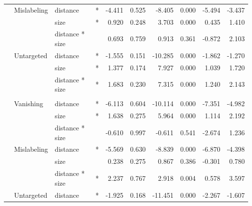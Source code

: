 \begin{longtable}[t]{llllrrrrrr}
\cmidrule{2-10}\nopagebreak
\hspace{1em} & Mislabeling & distance & * & -4.411 & 0.525 & -8.405 & 0.000 & -5.494 & -3.437\\
\cmidrule{3-10}\nopagebreak
\hspace{1em} &  & size & * & 0.920 & 0.248 & 3.703 & 0.000 & 0.435 & 1.410\\
\cmidrule{3-10}\nopagebreak
\hspace{1em} &  & distance * size &  & 0.693 & 0.759 & 0.913 & 0.361 & -0.872 & 2.103\\
\cmidrule{2-10}\nopagebreak
\hspace{1em} & Untargeted & distance & * & -1.555 & 0.151 & -10.285 & 0.000 & -1.862 & -1.270\\
\cmidrule{3-10}\nopagebreak
\hspace{1em} &  & size & * & 1.377 & 0.174 & 7.927 & 0.000 & 1.039 & 1.720\\
\cmidrule{3-10}\nopagebreak
\hspace{1em} &  & distance * size & * & 1.683 & 0.230 & 7.315 & 0.000 & 1.240 & 2.143\\
\cmidrule{1-10}\pagebreak[0]
\addlinespace[0.3em]
\multicolumn{10}{l}{\textbf{Faster R-CNN}}\\
\hspace{1em} & Vanishing & distance & * & -6.113 & 0.604 & -10.114 & 0.000 & -7.351 & -4.982\\
\cmidrule{3-10}\nopagebreak
\hspace{1em} &  & size & * & 1.638 & 0.275 & 5.964 & 0.000 & 1.114 & 2.192\\
\cmidrule{3-10}\nopagebreak
\hspace{1em} &  & distance * size &  & -0.610 & 0.997 & -0.611 & 0.541 & -2.674 & 1.236\\
\cmidrule{2-10}\nopagebreak
\hspace{1em} & Mislabeling & distance & * & -5.569 & 0.630 & -8.839 & 0.000 & -6.870 & -4.398\\
\cmidrule{3-10}\nopagebreak
\hspace{1em} &  & size &  & 0.238 & 0.275 & 0.867 & 0.386 & -0.301 & 0.780\\
\cmidrule{3-10}\nopagebreak
\hspace{1em} &  & distance * size & * & 2.237 & 0.767 & 2.918 & 0.004 & 0.578 & 3.597\\
\cmidrule{2-10}\nopagebreak
\hspace{1em} & Untargeted & distance & * & -1.925 & 0.168 & -11.451 & 0.000 & -2.267 & -1.607\\

\end{longtable}
